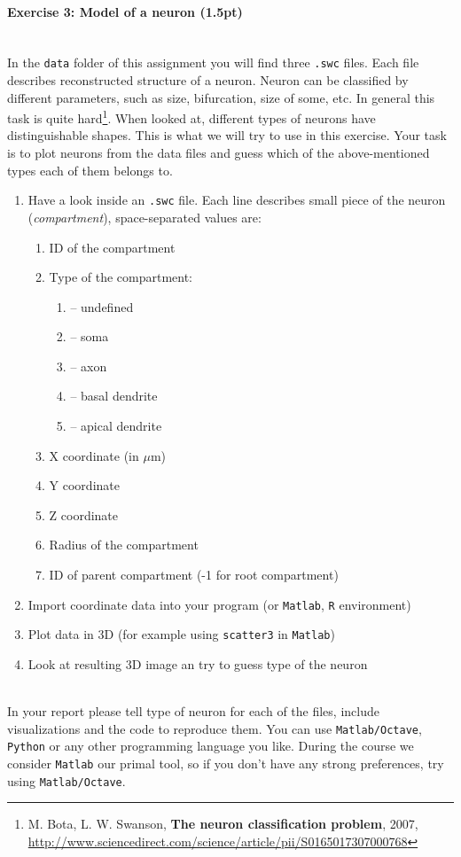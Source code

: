 \documentclass[a4paper,11pt]{article}
\newenvironment{exercise}[3]{\paragraph{Exercise #1: #2 (#3pt)}\ \\}{
\medskip}
\begin{document}
\begin{exercise}{3}{Model of a neuron}{1.5}
In the \texttt{data} folder of this assignment you will find three \texttt{.swc} files. Each file describes reconstructed structure of a neuron. Neuron can be classified by different parameters, such as size, bifurcation, size of some, etc. In general this task is quite hard\footnote{M. Bota, L. W. Swanson, \textbf{The neuron classification problem}, 2007, 
\url{http://www.sciencedirect.com/science/article/pii/S0165017307000768}}. When looked at, different types of neurons have distinguishable shapes. This is what we will try to use in this exercise. Your task is to plot neurons from the data files and guess which of the above-mentioned types each of them belongs to.
\begin{enumerate}
	\item Have a look inside an \texttt{.swc} file. Each line describes small piece of the neuron (\emph{compartment}), space-separated values are: 
	\begin{enumerate}
		\item ID of the compartment
		\item Type of the compartment:
		\begin{enumerate}
			\item[0] -- undefined
			\item[1] -- soma
			\item[2] -- axon
			\item[3] -- basal dendrite
			\item[4] -- apical dendrite
		\end{enumerate}
		\item X coordinate (in $\mu$m)
		\item Y coordinate
		\item Z coordinate
		\item Radius of the compartment
		\item ID of parent compartment (-1 for root compartment)
	\end{enumerate}
	\item Import coordinate data into your program (or \texttt{Matlab}, \texttt{R} environment)
	\item Plot data in 3D (for example using \texttt{scatter3} in \texttt{Matlab})
	\item Look at resulting 3D image an try to guess type of the neuron
\end{enumerate}
\ \\
In your report please tell type of neuron for each of the files, include visualizations and the code to reproduce them. You can use \texttt{Matlab/Octave}, \texttt{Python} or any other programming language you like. During the course we consider \texttt{Matlab} our primal tool, so if you don't have any strong preferences, try using \texttt{Matlab/Octave}.
\end{exercise}
\end{document}
